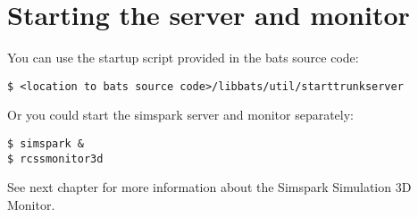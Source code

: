 \section{Starting the server and monitor}
You can use the startup script provided in the bats source code:
\begin{verbatim}
$ <location to bats source code>/libbats/util/starttrunkserver
\end{verbatim}
Or you could start the simspark server and monitor separately:
\begin{verbatim}
$ simspark &
$ rcssmonitor3d
\end{verbatim}
See next chapter for more information about the Simspark Simulation 3D Monitor.

